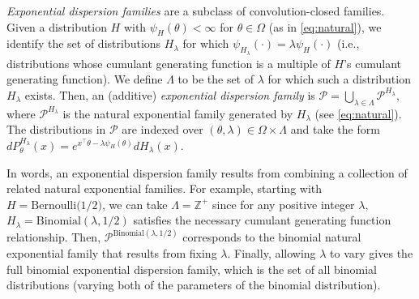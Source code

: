 \documentclass[12pt]{article}
\begin{document}
\emph{Exponential dispersion families} \citep{jorgensen1992exponential, jorgensen1998stationary} are a subclass of convolution-closed families. Given a distribution $H$ with $\psi_H(\theta)<\infty$ for $\theta\in\Omega$ (as in \eqref{eq:natural}), we identify the set of distributions $H_\lambda$ for which $\psi_{H_\lambda}(\cdot)=\lambda\psi_H(\cdot)$ (i.e., distributions whose cumulant generating function is a multiple of $H$'s cumulant generating function).  We define $\Lambda$ to be the set of $\lambda$ for which such a distribution $H_\lambda$ exists.  Then, an (additive) \emph{exponential dispersion family} is $\mathcal{P} = \bigcup_{\lambda \in \Lambda}\mathcal P^{H_\lambda}$, where $\mathcal P^{H_\lambda}$ is the natural exponential family generated by $H_\lambda$ (see \eqref{eq:natural}).  The distributions in $\mathcal P$ are indexed over $(\theta,\lambda)\in\Omega\times\Lambda$ and take the form $dP^{H_\lambda}_{\theta} (x) = e^{x^\top \theta - \lambda \psi_H(\theta)} dH_\lambda(x)$. 

In words, an exponential dispersion family results from  combining a collection of related natural exponential families.  For example, starting with $H=\text{Bernoulli(1/2)}$, we can take $\Lambda=\mathbb Z^+$ since for any positive integer $\lambda$, $H_\lambda=\text{Binomial}(\lambda,1/2)$ satisfies the necessary cumulant generating function relationship.  Then, $\mathcal P^{\text{Binomial}(\lambda,1/2)}$ corresponds to the binomial natural exponential family that results from fixing $\lambda$. 
Finally, allowing $\lambda$ to vary gives the full binomial exponential dispersion family, which is the set of all binomial distributions (varying both of the parameters of the binomial distribution). 
\end{document}
